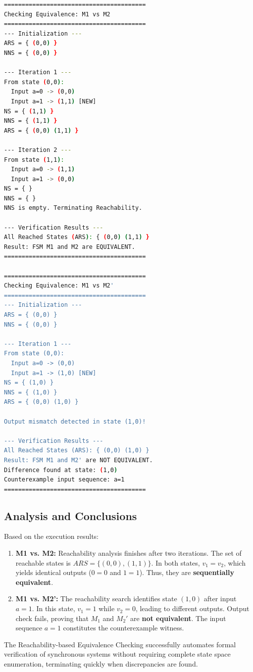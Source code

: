 \documentclass[12pt,a4paper]{article}
\begin{document}
\begin{lstlisting}[language=bash]
========================================
Checking Equivalence: M1 vs M2
========================================
--- Initialization ---
ARS = { (0,0) }
NNS = { (0,0) }

--- Iteration 1 ---
From state (0,0):
  Input a=0 -> (0,0)
  Input a=1 -> (1,1) [NEW]
NS = { (1,1) }
NNS = { (1,1) }
ARS = { (0,0) (1,1) }

--- Iteration 2 ---
From state (1,1):
  Input a=0 -> (1,1)
  Input a=1 -> (0,0)
NS = { }
NNS = { }
NNS is empty. Terminating Reachability.

--- Verification Results ---
All Reached States (ARS): { (0,0) (1,1) }
Result: FSM M1 and M2 are EQUIVALENT.
========================================

========================================
Checking Equivalence: M1 vs M2'
========================================
--- Initialization ---
ARS = { (0,0) }
NNS = { (0,0) }

--- Iteration 1 ---
From state (0,0):
  Input a=0 -> (0,0)
  Input a=1 -> (1,0) [NEW]
NS = { (1,0) }
NNS = { (1,0) }
ARS = { (0,0) (1,0) }

Output mismatch detected in state (1,0)!

--- Verification Results ---
All Reached States (ARS): { (0,0) (1,0) }
Result: FSM M1 and M2' are NOT EQUIVALENT.
Difference found at state: (1,0)
Counterexample input sequence: a=1
========================================
\end{lstlisting}

\subsection{Analysis and Conclusions}
Based on the execution results:
\begin{enumerate}
    \item \textbf{M1 vs. M2:} Reachability analysis finishes after two iterations. The set of reachable states is $ARS = \{(0,0), (1,1)\}$. In both states, $v_1 = v_2$, which yields identical outputs ($0=0$ and $1=1$). Thus, they are \textbf{sequentially equivalent}.
    \item \textbf{M1 vs. M2':} The reachability search identifies state $(1,0)$ after input $a = 1$. In this state, $v_1 = 1$ while $v_2 = 0$, leading to different outputs. Output check fails, proving that $M_1$ and $M_2'$ are \textbf{not equivalent}. The input sequence $a = 1$ constitutes the counterexample witness.
\end{enumerate}
The Reachability-based Equivalence Checking successfully automates formal verification of synchronous systems without requiring complete state space enumeration, terminating quickly when discrepancies are found.
\end{document}
